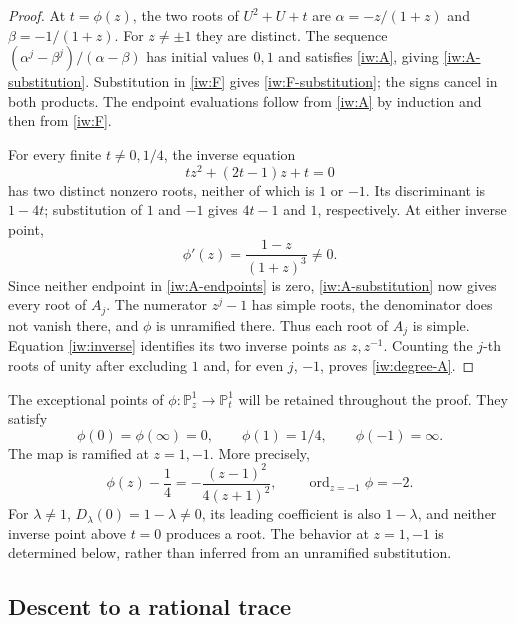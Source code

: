 \documentclass[11pt,a4paper]{article}
\theoremstyle{definition}
\theoremstyle{remark}
\begin{document}
\begin{proof}
At \(t=\phi(z)\), the two roots of \(U^2+U+t\) are
\(\alpha=-z/(1+z)\) and \(\beta=-1/(1+z)\). For \(z\ne\pm1\)
they are distinct. The sequence
\((\alpha^j-\beta^j)/(\alpha-\beta)\) has initial values \(0,1\)
and satisfies \eqref{iw:A}, giving \eqref{iw:A-substitution}.
Substitution in \eqref{iw:F} gives \eqref{iw:F-substitution};
the signs cancel in both products. The endpoint evaluations follow
from \eqref{iw:A} by induction and then from \eqref{iw:F}.

For every finite \(t\ne0,1/4\), the inverse equation
\begin{equation}\label{iw:inverse}
 tz^2+(2t-1)z+t=0
\end{equation}
has two distinct nonzero roots, neither of which is \(1\) or \(-1\).
Its discriminant is \(1-4t\); substitution of \(1\) and \(-1\)
gives \(4t-1\) and \(1\), respectively. At either inverse point,
\begin{equation}\label{iw:phi-derivative}
 \phi'(z)=\frac{1-z}{(1+z)^3}\ne0.
\end{equation}
Since neither endpoint in \eqref{iw:A-endpoints} is zero,
\eqref{iw:A-substitution} now gives every root of \(A_j\).
The numerator \(z^j-1\) has simple roots, the denominator does not
vanish there, and \(\phi\) is unramified there. Thus each root of
\(A_j\) is simple. Equation \eqref{iw:inverse} identifies its two
inverse points as \(z,z^{-1}\). Counting the \(j\)-th roots of unity
after excluding \(1\) and, for even \(j\), \(-1\), proves
\eqref{iw:degree-A}.
\end{proof}

The exceptional points of \(\phi:\mathbb P^1_z\to\mathbb P^1_t\)
will be retained throughout the proof. They satisfy
\[
 \phi(0)=\phi(\infty)=0,\qquad
 \phi(1)=1/4,\qquad \phi(-1)=\infty.
\]
The map is ramified at \(z=1,-1\). More precisely,
\begin{equation}\label{iw:ramification}
 \phi(z)-\frac14=-\frac{(z-1)^2}{4(z+1)^2},
 \qquad
 \operatorname{ord}_{z=-1}\phi=-2.
\end{equation}
For \(\lambda\ne1\), \(D_\lambda(0)=1-\lambda\ne0\), its leading
coefficient is also \(1-\lambda\), and neither inverse point above
\(t=0\) produces a root. The behavior at \(z=1,-1\) is determined
below, rather than inferred from an unramified substitution.

\subsection{Descent to a rational trace}
\end{document}
